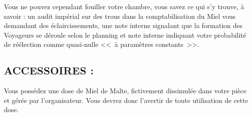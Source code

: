 \documentclass[14pt,twocolumn]{extarticle}
\begin{document}
Vous ne pouvez cependant fouiller votre chambre, vous savez ce qui s'y trouve,
à savoir : un audit impérial sur des trous dans la comptabilisation du Miel
vous demandant des éclaircissements, une note interne signalant que la
formation des Voyageurs se déroule selon le planning et note interne indiquant
votre probabilité de réélection comme quasi-nulle <<~à paramètres constants~>>.

\subsection{ACCESSOIRES :}

Vous possédez une dose de Miel de Malte, fictivement dissimulée dans votre
pièce et gérée par l'organisateur. Vous devrez donc l'avertir de toute
utilisation de cette dose.
\end{document}
